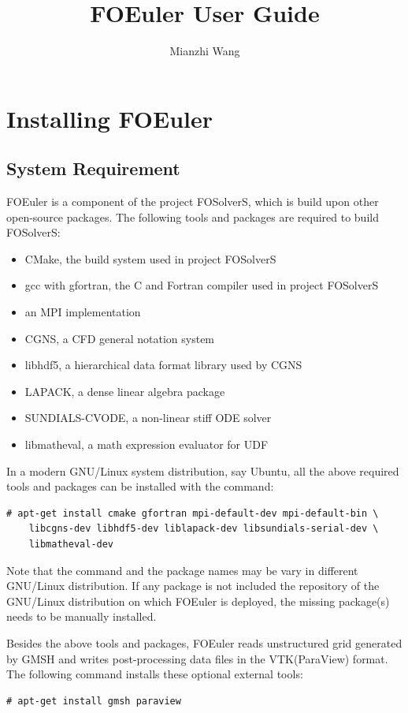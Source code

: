 \documentclass[]{article}
\title{FOEuler User Guide}
\author{Mianzhi Wang}
\begin{document}
\maketitle

\tableofcontents

\section{Installing FOEuler}

\subsection{System Requirement}
\label{sec:requirement}

FOEuler is a component of the project FOSolverS, which is build upon other open-source packages.
The following tools and packages are required to build FOSolverS:
\begin{itemize}
  \item CMake, the build system used in project FOSolverS
  \item gcc with gfortran, the C and Fortran compiler used in project FOSolverS
  \item an MPI implementation
  \item CGNS, a CFD general notation system
  \item libhdf5, a hierarchical data format library used by CGNS
  \item LAPACK, a dense linear algebra package
  \item SUNDIALS-CVODE, a non-linear stiff ODE solver
  \item libmatheval, a math expression evaluator for UDF
\end{itemize}
In a modern GNU/Linux system distribution, say Ubuntu, all the above required tools and packages can
be installed with the command:
\begin{lstlisting}[backgroundcolor=\color{lightgray}]
  # apt-get install cmake gfortran mpi-default-dev mpi-default-bin \
    libcgns-dev libhdf5-dev liblapack-dev libsundials-serial-dev \
    libmatheval-dev
\end{lstlisting}
Note that the command and the package names may be vary in different GNU/Linux distribution.
If any package is not included the repository of the GNU/Linux distribution on which FOEuler is
deployed, the missing package(s) needs to be manually installed.

Besides the above tools and packages, FOEuler reads unstructured grid generated by GMSH and writes
post-processing data files in the VTK(ParaView) format.
The following command installs these optional external tools:
\begin{lstlisting}[backgroundcolor=\color{lightgray}]
  # apt-get install gmsh paraview
\end{lstlisting}
\end{document}
